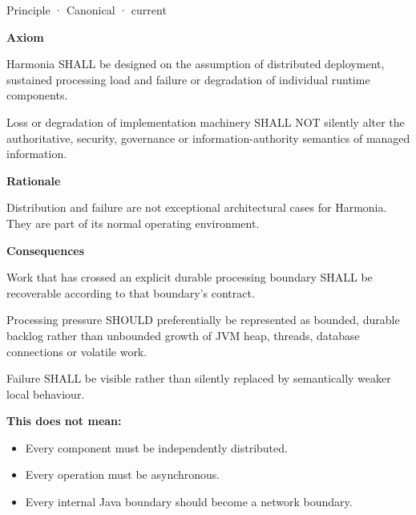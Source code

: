 \label{element:0d9673833eb840eab03804aa076c1b0c}
{\small Principle · Canonical · current}\par

\par\medskip\textbf{Axiom}\par


Harmonia SHALL be designed on the assumption of distributed deployment,
sustained processing load and failure or degradation of individual
runtime components.



Loss or degradation of implementation machinery SHALL NOT silently alter
the authoritative, security, governance or information-authority
semantics of managed information.



\par\medskip\textbf{Rationale}\par


Distribution and failure are not exceptional architectural cases for
Harmonia. They are part of its normal operating environment.



\par\medskip\textbf{Consequences}\par


Work that has crossed an explicit durable processing boundary SHALL be
recoverable according to that boundary's contract.



Processing pressure SHOULD preferentially be represented as bounded,
durable backlog rather than unbounded growth of JVM heap, threads,
database connections or volatile work.



Failure SHALL be visible rather than silently replaced by semantically
weaker local behaviour.



\textbf{This does not mean:}



\begin{itemize}


\item Every component must be independently distributed.

\item Every operation must be asynchronous.

\item Every internal Java boundary should become a network boundary.

\end{itemize}

